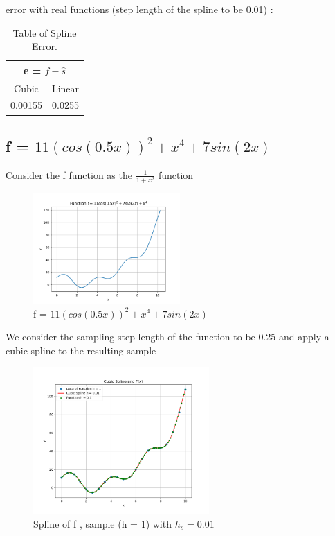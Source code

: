 \documentclass[12pt]{article}
\begin{document}
\begin{itemize}
\newpage

error with real functions (step length of the spline to be 0.01) : \\
\begin{table}[h!]
  \begin{center}
    \caption{Table of Spline Error.}
    \label{tab:table1}
    \begin{tabular}{c|c}
      \multicolumn{2}{c}{e = $f - \hat{s}$}\\
      \hline
      \multirow{1}{*}{Cubic} & \multirow{1}{*}{Linear} \\
      \hline
      \multirow{2}{*}{0.00155} & \multirow{2}{*}{0.0255}
      
    \end{tabular}
  \end{center}
\end{table}
\newpage
\subsection{f = $11 (cos(0.5x))^2 + x^4 + 7 sin(2x)$}
Consider the f function as the $\frac{1}{1+x^2}$ function\\
\begin{figure}[h]
    \centering
    \includegraphics[width=0.5\textwidth]{img/f}
    \caption{f = $11 (cos(0.5x))^2 + x^4 + 7 sin(2x)$}
    \label{fig:mesh1}
\end{figure}
We consider the sampling step length of the function to be 0.25 and apply a cubic spline to the resulting sample \\
\begin{figure}[h]
    \centering
    \includegraphics[width=0.6\textwidth]{img/f1}
    \caption{Spline of f , sample (h = 1) with $h_s = 0.01$}
    \label{fig:mesh1}
    

\end{figure}
\end{itemize}
\end{document}
